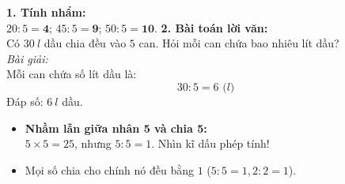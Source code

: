 \documentclass[11pt,a4paper]{article}
\begin{document}
\vspace{-1.5mm}
\noindent
\begin{minipage}[t]{0.49\textwidth}\vspace{0pt}
\begin{tcolorbox}[
  enhanced,
  colback=green!4!white,
  colframe=green!60!black,
  arc=2mm, boxrule=0.8pt,
  left=2mm, right=2mm, top=1.8mm, bottom=1.8mm,
  title={\footnotesize\bfseries\color{white}\faCheckCircle\ 4. Ví dụ thực hành chuẩn mực}
]
{\footnotesize
\textbf{1. Tính nhẩm:}\\
$20 : 5 = \mathbf{4}$; $45 : 5 = \mathbf{9}$; $50 : 5 = \mathbf{10}$.
\textbf{2. Bài toán lời văn:}\\
Có $30\ l$ dầu chia đều vào $5$ can. Hỏi mỗi can chứa bao nhiêu lít dầu?\\
\textit{Bài giải:}\\
Mỗi can chứa số lít dầu là:
$$30 : 5 = 6\text{ (}l\text{)}$$
Đáp số: $6\ l$ dầu.
}
\end{tcolorbox}
\end{minipage}
\hfill
\begin{minipage}[t]{0.49\textwidth}\vspace{0pt}
\begin{tcolorbox}[
  enhanced,
  colback=red!4!white,
  colframe=red!75!black,
  arc=2mm, boxrule=0.8pt,
  left=2mm, right=2mm, top=1.8mm, bottom=1.8mm,
  title={\footnotesize\bfseries\color{white}\faExclamationTriangle\ 5. Mẹo tránh bẫy trắc nghiệm}
]
{\footnotesize
\begin{itemize}\setlength{\itemsep}{1pt}\setlength{\leftskip}{-2.5mm}
  \item \textbf{Nhầm lẫn giữa nhân 5 và chia 5:}\\
  $5 \times 5 = 25$, nhưng $5 : 5 = 1$. Nhìn kĩ dấu phép tính!
  \item Mọi số chia cho chính nó đều bằng $1$ ($5:5=1, 2:2=1$).
\end{itemize}
}
\end{tcolorbox}
\end{minipage}
\end{document}
